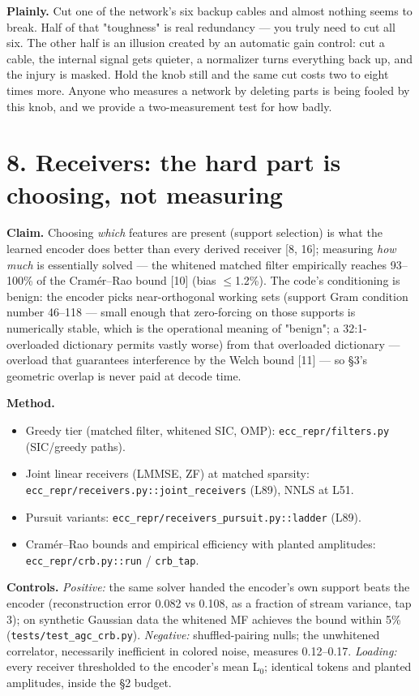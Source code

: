 \documentclass[10pt]{article}
\begin{document}
\textbf{Plainly.} Cut one of the network's six backup cables and almost nothing seems to break. Half of
that "toughness" is real redundancy --- you truly need to cut all six. The other half is an illusion
created by an automatic gain control: cut a cable, the internal signal gets quieter, a normalizer
turns everything back up, and the injury is masked. Hold the knob still and the same cut costs two
to eight times more. Anyone who measures a network by deleting parts is being fooled by this knob,
and we provide a two-measurement test for how badly.

\section{8. Receivers: the hard part is choosing, not measuring}

\textbf{Claim.} Choosing \emph{which} features are present (support selection) is what the learned encoder
does better than every derived receiver [8, 16]; measuring \emph{how much} is essentially solved --- the
whitened matched filter empirically reaches 93--100\% of the Cramér--Rao bound [10] (bias $\le$1.2\%). The
code's conditioning is benign: the encoder picks near-orthogonal working sets (support Gram condition number 46--118 --- small enough that zero-forcing on those supports is
numerically stable, which is the operational meaning of "benign"; a 32:1-overloaded dictionary
permits vastly worse) from that overloaded dictionary --- overload that guarantees interference by the
Welch bound [11] --- so §3's geometric overlap is never paid at decode time.

\textbf{Method.}
\begin{itemize}\setlength\itemsep{1pt}
\item Greedy tier (matched filter, whitened SIC, OMP): \texttt{ecc\_repr/filters.py} (SIC/greedy paths).
\item Joint linear receivers (LMMSE, ZF) at matched sparsity: \texttt{ecc\_repr/receivers.py::joint\_receivers} (L89), NNLS at L51.
\item Pursuit variants: \texttt{ecc\_repr/receivers\_pursuit.py::ladder} (L89).
\item Cramér--Rao bounds and empirical efficiency with planted amplitudes: \texttt{ecc\_repr/crb.py::run} / \texttt{crb\_tap}.
\end{itemize}
\textbf{Controls.} \emph{Positive:} the same solver handed the encoder's own support beats the encoder
(reconstruction error 0.082 vs 0.108, as a fraction of stream variance, tap 3); on synthetic Gaussian data the whitened MF achieves the
bound within 5\% (\texttt{tests/test\_agc\_crb.py}). \emph{Negative:} shuffled-pairing nulls; the unwhitened
correlator, necessarily inefficient in colored noise, measures 0.12--0.17. \emph{Loading:} every receiver
thresholded to the encoder's mean L$_{0}$; identical tokens and planted amplitudes, inside the §2 budget.
\end{document}

